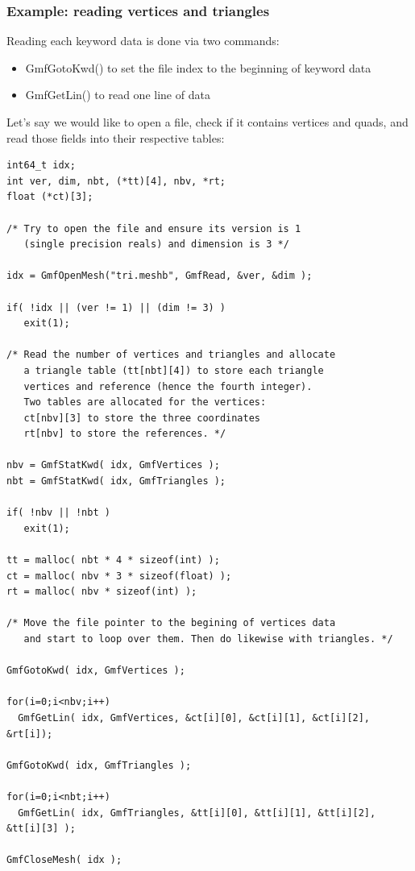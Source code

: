 \documentclass[a4paper,12pt]{article}
\begin{document}
\subsubsection{Example: reading vertices and triangles}

Reading each keyword data is done via two commands:

\begin{itemize}
\item GmfGotoKwd() to set the file index to the beginning of keyword data
\item GmfGetLin() to read one line of data
\end{itemize}

Let's say we would like to open a file, check if it contains vertices and quads, and read those fields into their respective tables:

\begin{tt}
\begin{verbatim}
int64_t idx;
int ver, dim, nbt, (*tt)[4], nbv, *rt;
float (*ct)[3];

/* Try to open the file and ensure its version is 1
   (single precision reals) and dimension is 3 */

idx = GmfOpenMesh("tri.meshb", GmfRead, &ver, &dim );

if( !idx || (ver != 1) || (dim != 3) )
   exit(1);

/* Read the number of vertices and triangles and allocate
   a triangle table (tt[nbt][4]) to store each triangle
   vertices and reference (hence the fourth integer).
   Two tables are allocated for the vertices:
   ct[nbv][3] to store the three coordinates
   rt[nbv] to store the references. */

nbv = GmfStatKwd( idx, GmfVertices );
nbt = GmfStatKwd( idx, GmfTriangles );

if( !nbv || !nbt )
   exit(1);

tt = malloc( nbt * 4 * sizeof(int) );
ct = malloc( nbv * 3 * sizeof(float) );
rt = malloc( nbv * sizeof(int) );

/* Move the file pointer to the begining of vertices data
   and start to loop over them. Then do likewise with triangles. */

GmfGotoKwd( idx, GmfVertices );

for(i=0;i<nbv;i++)
  GmfGetLin( idx, GmfVertices, &ct[i][0], &ct[i][1], &ct[i][2], &rt[i]);

GmfGotoKwd( idx, GmfTriangles );

for(i=0;i<nbt;i++)
  GmfGetLin( idx, GmfTriangles, &tt[i][0], &tt[i][1], &tt[i][2], &tt[i][3] );

GmfCloseMesh( idx );
\end{verbatim}
\end{tt}
\normalfont
\end{document}
